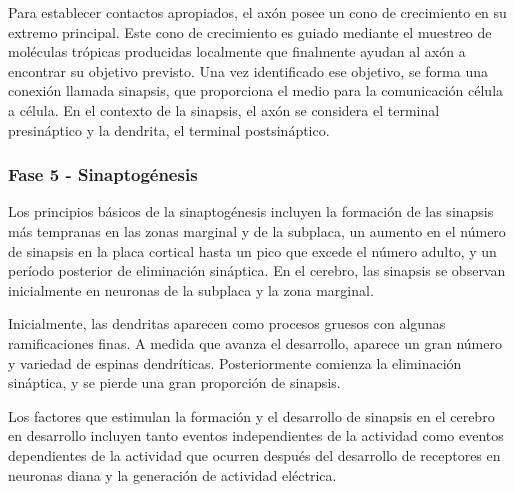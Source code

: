 \documentclass[11pt,letterpaper]{report}
\begin{document}
Para establecer contactos apropiados, el axón posee un cono de crecimiento en
su extremo principal. Este cono de crecimiento es guiado mediante el muestreo
de moléculas trópicas producidas localmente que finalmente ayudan al axón a
encontrar su objetivo previsto. Una vez identificado ese objetivo, se forma una
conexión llamada sinapsis, que proporciona el medio para la comunicación célula
a célula. En el contexto de la sinapsis, el axón se considera el terminal
presináptico y la dendrita, el terminal postsináptico. \cite{Gibb2018}

\subsubsection{Fase 5 - Sinaptogénesis}
Los principios básicos de la sinaptogénesis incluyen la formación de las
sinapsis más tempranas en las zonas marginal y de la subplaca, un aumento en el
número de sinapsis en la placa cortical hasta un pico que excede el número
adulto, y un período posterior de eliminación sináptica. En el cerebro, las
sinapsis se observan inicialmente en neuronas de la subplaca y la zona marginal.
\cite{Polin124}

Inicialmente, las dendritas aparecen como procesos gruesos con algunas 
ramificaciones finas. A medida que avanza el desarrollo, aparece un gran número
y variedad de espinas dendríticas. Posteriormente comienza la eliminación
sináptica, y se pierde una gran proporción de sinapsis. \cite{Polin124}

Los factores que estimulan la formación y el desarrollo de sinapsis en el
cerebro en desarrollo incluyen tanto eventos independientes de la actividad
como eventos dependientes de la actividad que ocurren después del desarrollo de
receptores en neuronas diana y la generación de actividad eléctrica.
\cite{Polin124}
\end{document}
